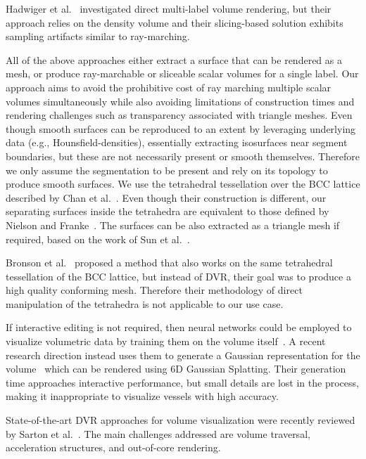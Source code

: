 \documentclass[journal]{vgtc}                     %
\begin{document}
Hadwiger et al.~\cite{hadwiger2003high} investigated direct multi-label volume rendering, but their approach relies on the density volume and their slicing-based solution exhibits sampling artifacts similar to ray-marching.

All of the above approaches either extract a surface that can be rendered as a mesh, or produce ray-marchable or sliceable scalar volumes for a single label. 
Our approach aims to avoid the prohibitive cost of ray marching multiple scalar volumes simultaneously while also avoiding limitations of construction times and rendering challenges such as transparency associated with triangle meshes. Even though smooth surfaces can be reproduced to an extent by leveraging underlying data (e.g., Hounsfield-densities), essentially extracting isosurfaces near segment boundaries, but these are not necessarily present or smooth themselves. Therefore we only assume the segmentation to be present and rely on its topology to produce smooth surfaces. We use the tetrahedral tessellation over the BCC lattice described by Chan et al.~\cite{CHAN199883}. Even though their construction is different, our separating surfaces inside the tetrahedra are equivalent to those defined by Nielson and Franke~\cite{nielson1997computing}. The surfaces can be also extracted as a triangle mesh if required, based on the work of Sun et al.~\cite{sun2024multi}.

Bronson et al.~\cite{bronson2014lattice} proposed a method that also works on the same tetrahedral tessellation of the BCC lattice, but instead of DVR, their goal was to produce a high quality conforming mesh. Therefore their methodology of direct manipulation of the tetrahedra is not applicable to our use case.

If interactive editing is not required, then neural networks could be employed to visualize volumetric data by training them on the volume itself~\cite{berger2018Generative}. A recent research direction instead uses them to generate a Gaussian representation for the volume~\cite{gao2025render} which can be rendered using 6D Gaussian Splatting. Their generation time approaches interactive performance, but small details are lost in the process, making it inappropriate to visualize vessels with high accuracy.

State-of-the-art DVR approaches for volume visualization were recently reviewed by Sarton et al.~\cite{sarton2023state}.
The main challenges addressed are volume traversal, acceleration structures, and out-of-core rendering.
\end{document}
